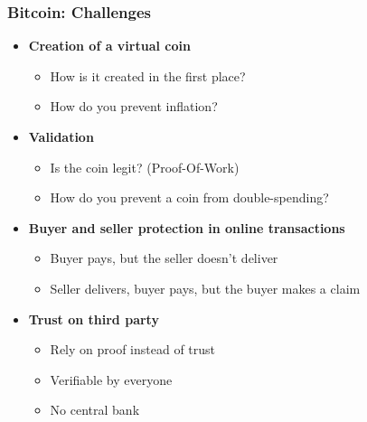 \begin{frame}
    \frametitle{Bitcoin: Challenges}
    \begin{itemize}
        \item \textbf{Creation of a virtual coin}
            \begin{itemize}
                \item How is it created in the first place?
                \item How do you prevent inflation?
            \end{itemize}
        \item \textbf{Validation}
            \begin{itemize}
                \item Is the coin legit? \alert{(Proof-Of-Work)}
                \item How do you prevent a coin from \alert{double-spending}?
            \end{itemize}
        \item \textbf{Buyer and seller protection in online transactions}
            \begin{itemize}
                \item Buyer pays, but the seller doesn't deliver
                \item Seller delivers, buyer pays, but the buyer makes a claim
            \end{itemize}
        \item \textbf{Trust on third party}
            \begin{itemize}
                \item Rely on proof instead of trust
                \item Verifiable by everyone
                \item No central bank
            \end{itemize}
    \end{itemize}
\end{frame}

